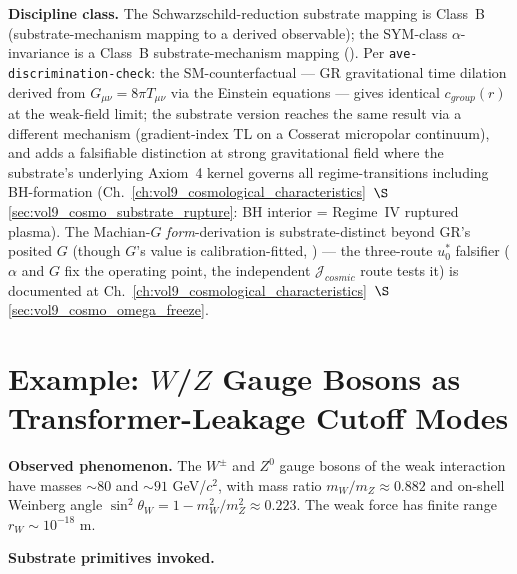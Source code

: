 \textbf{Discipline class.} The Schwarzschild-reduction substrate mapping is Class~B (substrate-mechanism mapping to a derived observable); the SYM-class $\alpha$-invariance is a Class~B substrate-mechanism mapping (). Per \texttt{ave-discrimination-check}: the SM-counterfactual --- GR gravitational time dilation derived from $G_{\mu\nu} = 8\pi T_{\mu\nu}$ via the Einstein equations --- gives identical $c_{group}(r)$ at the weak-field limit; the substrate version reaches the same result via a different mechanism (gradient-index TL on a Cosserat micropolar continuum), and adds a falsifiable distinction at strong gravitational field where the substrate's underlying Axiom~4 kernel governs all regime-transitions including BH-formation (Ch.~\ref{ch:vol9_cosmological_characteristics}~$\S$\ref{sec:vol9_cosmo_substrate_rupture}: BH interior = Regime~IV ruptured plasma). The Machian-$G$ \emph{form}-derivation is substrate-distinct beyond GR's posited $G$ (though $G$'s value is calibration-fitted, ) --- the three-route $u_0^*$ falsifier ($\alpha$ and $G$ fix the operating point, the independent $\mathcal{J}_{cosmic}$ route tests it) is documented at Ch.~\ref{ch:vol9_cosmological_characteristics}~$\S$\ref{sec:vol9_cosmo_omega_freeze}.

\section{Example: $W$/$Z$ Gauge Bosons as Transformer-Leakage Cutoff Modes}
\label{sec:vol9_app_wz_transformer_leakage}

\textbf{Observed phenomenon.} The $W^\pm$ and $Z^0$ gauge bosons of the weak interaction have masses $\sim 80$ and $\sim 91$ GeV/$c^2$, with mass ratio $m_W/m_Z \approx 0.882$ and on-shell Weinberg angle $\sin^2\theta_W = 1 - m_W^2/m_Z^2 \approx 0.223$. The weak force has finite range $r_W \sim 10^{-18}$ m.

\textbf{Substrate primitives invoked.}

